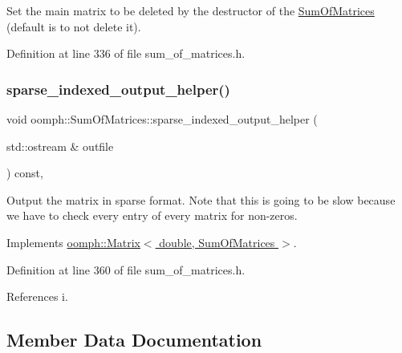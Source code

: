 Set the main matrix to be deleted by the destructor of the \hyperlink{classoomph_1_1SumOfMatrices}{Sum\+Of\+Matrices} (default is to not delete it). 



Definition at line 336 of file sum\+\_\+of\+\_\+matrices.\+h.

\mbox{\label{classoomph_1_1SumOfMatrices_af93e5663c282ab73bc01c8dff58d0e82}} 
\subsubsection{\texorpdfstring{sparse\+\_\+indexed\+\_\+output\+\_\+helper()}{sparse\_indexed\_output\_helper()}}
{\footnotesize\ttfamily void oomph\+::\+Sum\+Of\+Matrices\+::sparse\+\_\+indexed\+\_\+output\+\_\+helper (\begin{DoxyParamCaption}\item[{std\+::ostream \&}]{outfile }\end{DoxyParamCaption}) const\hspace{0.3cm}{\ttfamily [inline]}, {\ttfamily [virtual]}}



Output the matrix in sparse format. Note that this is going to be slow because we have to check every entry of every matrix for non-\/zeros. 



Implements \hyperlink{classoomph_1_1Matrix_a7a5b44e7688ce2c2f7552da104e615c8}{oomph\+::\+Matrix$<$ double, Sum\+Of\+Matrices $>$}.



Definition at line 360 of file sum\+\_\+of\+\_\+matrices.\+h.



References i.



\subsection{Member Data Documentation}
\mbox{\label{classoomph_1_1SumOfMatrices_a65dfe9fb848ae855f9949f1621df4df8}} 
